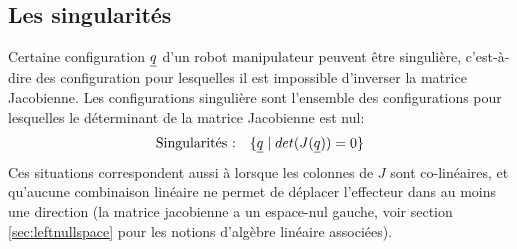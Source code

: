 

\subsection{Les singularités}
\label{sec:singu}
Certaine configuration $\underline{q}$ d'un robot manipulateur peuvent être singulière, c'est-à-dire des configuration pour lesquelles il est impossible d'inverser la matrice Jacobienne. Les configurations singulière sont l'ensemble des configurations pour lesquelles le déterminant de la matrice Jacobienne est nul:
\begin{align}
\text{Singularités :} \quad \{  \underline{q} \; | \; det(J(\underline{q})) = 0 \}
\end{align} 
Ces situations correspondent aussi à lorsque les colonnes de $J$ sont co-linéaires, et qu'aucune combinaison linéaire ne permet de déplacer l'effecteur dans au moins une direction (la matrice jacobienne a un espace-nul gauche, voir section \ref{sec:leftnullspace} pour les notions d'algèbre linéaire associées). 


